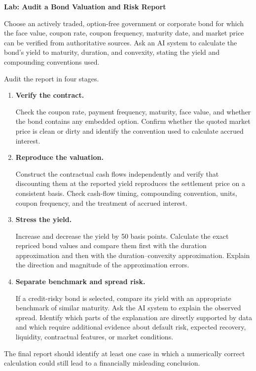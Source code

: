 \textbf{Lab: Audit a Bond Valuation and Risk Report}

Choose an actively traded, option-free government or corporate bond for which the face value, coupon rate, coupon frequency, maturity date, and market price can be verified from authoritative sources. Ask an AI system to calculate the bond's yield to maturity, duration, and convexity, stating the yield and compounding conventions used.

Audit the report in four stages.

\begin{enumerate}

\item \textbf{Verify the contract.}

Check the coupon rate, payment frequency, maturity, face value, and whether the bond contains any embedded option. Confirm whether the quoted market price is clean or dirty and identify the convention used to calculate accrued interest.

\item \textbf{Reproduce the valuation.}

Construct the contractual cash flows independently and verify that discounting them at the reported yield reproduces the settlement price on a consistent basis. Check cash-flow timing, compounding convention, units, coupon frequency, and the treatment of accrued interest.

\item \textbf{Stress the yield.}

Increase and decrease the yield by 50 basis points. Calculate the exact repriced bond values and compare them first with the duration approximation and then with the duration--convexity approximation. Explain the direction and magnitude of the approximation errors.

\item \textbf{Separate benchmark and spread risk.}

If a credit-risky bond is selected, compare its yield with an appropriate benchmark of similar maturity. Ask the AI system to explain the observed spread. Identify which parts of the explanation are directly supported by data and which require additional evidence about default risk, expected recovery, liquidity, contractual features, or market conditions.

\end{enumerate}

The final report should identify at least one case in which a numerically correct calculation could still lead to a financially misleading conclusion.

